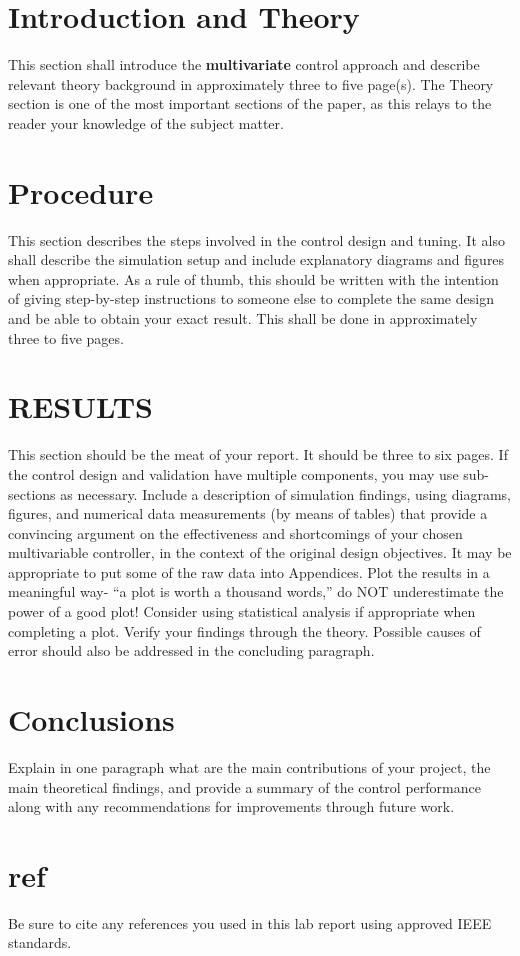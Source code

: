\documentclass[conf]{new-aiaa}
\begin{document}
\clearpage
\begin{doublespace}

\section{Introduction and Theory}
This section shall introduce the \textbf{multivariate} control approach and describe relevant theory background in approximately three to five page(s). The Theory section is one of the most important sections of the paper, as this relays to the reader your knowledge of the subject matter.

\section{Procedure}
This section describes the steps involved in the control design and tuning. It also shall describe
the simulation setup and include explanatory diagrams and figures when appropriate. As a rule of
thumb, this should be written with the intention of giving step-by-step instructions to someone
else to complete the same design and be able to obtain your exact result. This shall be done in
approximately three to five pages.

\section{RESULTS}

This section should be the meat of your report. It should be three to six pages. If the control
design and validation have multiple components, you may use sub-sections as necessary. Include
a description of simulation findings, using diagrams, figures, and numerical data measurements
(by means of tables) that provide a convincing argument on the effectiveness and shortcomings of
your chosen multivariable controller, in the context of the original design objectives. It may be
appropriate to put some of the raw data into Appendices. Plot the results in a meaningful way- “a
plot is worth a thousand words,” do NOT underestimate the power of a good plot! Consider
using statistical analysis if appropriate when completing a plot. Verify your findings through the
theory. Possible causes of error should also be addressed in the concluding paragraph.


\section{Conclusions}
Explain in one paragraph what are the main contributions of your project, the main theoretical
findings, and provide a summary of the control performance along with any recommendations for
improvements through future work.

\section{ref}
Be sure to cite any references you used in this lab report using approved IEEE standards. 





\end{doublespace}

\end{document}
